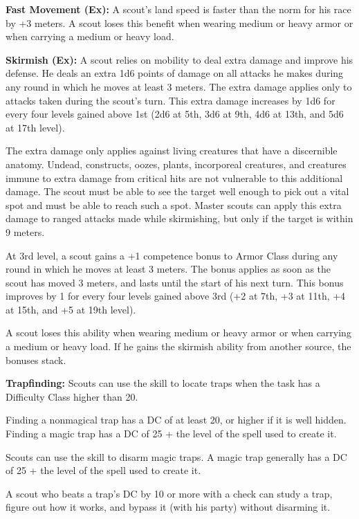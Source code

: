 \textbf{Fast Movement (Ex):} A scout's land speed is faster than the norm for his race by +3 meters. A scout loses this benefit when wearing medium or heavy armor or when carrying a medium or heavy load.


\textbf{Skirmish (Ex):} A scout relies on mobility to deal extra damage and improve his defense. He deals an extra 1d6 points of damage on all attacks he makes during any round in which he moves at least 3 meters. The extra damage applies only to attacks taken during the scout's turn. This extra damage increases by 1d6 for every four levels gained above 1st (2d6 at 5th, 3d6 at 9th, 4d6 at 13th, and 5d6 at 17th level).

The extra damage only applies against living creatures that have a discernible anatomy. Undead, constructs, oozes, plants, incorporeal creatures, and creatures immune to extra damage from critical hits are not vulnerable to this additional damage. The scout must be able to see the target well enough to pick out a vital spot and must be able to reach such a spot. Master scouts can apply this extra damage to ranged attacks made while skirmishing, but only if the target is within 9 meters.

At 3rd level, a scout gains a +1 competence bonus to Armor Class during any round in which he moves at least 3 meters. The bonus applies as soon as the scout has moved 3 meters, and lasts until the start of his next turn. This bonus improves by 1 for every four levels gained above 3rd (+2 at 7th, +3 at 11th, +4 at 15th, and +5 at 19th level).

A scout loses this ability when wearing medium or heavy armor or when carrying a medium or heavy load. If he gains the skirmish ability from another source, the bonuses stack.


\textbf{Trapfinding:} Scouts can use the  skill to locate traps when the task has a Difficulty Class higher than 20.

Finding a nonmagical trap has a DC of at least 20, or higher if it is well hidden. Finding a magic trap has a DC of 25 + the level of the spell used to create it.

Scouts can use the  skill to disarm magic traps. A magic trap generally has a DC of 25 + the level of the spell used to create it.

A scout who beats a trap's DC by 10 or more with a  check can study a trap, figure out how it works, and bypass it (with his party) without disarming it.


